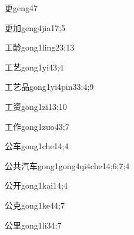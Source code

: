 \begin{verbete}{更}{geng4}{7}
\end{verbete}

\begin{verbete}{更加}{geng4jia1}{7;5}
\end{verbete}

\begin{verbete}{工龄}{gong1ling2}{3;13}
\end{verbete}

\begin{verbete}{工艺}{gong1yi4}{3;4}
\end{verbete}

\begin{verbete}{工艺品}{gong1yi4pin3}{3;4;9}
\end{verbete}

\begin{verbete}{工资}{gong1zi1}{3;10}
\end{verbete}

\begin{verbete}{工作}{gong1zuo4}{3;7}
\end{verbete}

\begin{verbete}{公车}{gong1che1}{4;4}
\end{verbete}

\begin{verbete}{公共汽车}{gong1gong4qi4che1}{4;6;7;4}
\end{verbete}

\begin{verbete}{公开}{gong1kai1}{4;4}
\end{verbete}

\begin{verbete}{公克}{gong1ke4}{4;7}
\end{verbete}

\begin{verbete}{公里}{gong1li3}{4;7}
\end{verbete}

